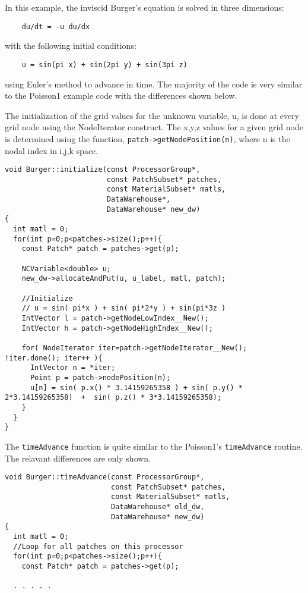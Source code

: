 \documentclass[12pt]{report}
\begin{document}
In this example, the inviscid Burger's equation is solved in three dimensions:
\begin{verbatim}
	du/dt = -u du/dx  
\end{verbatim}

with the following initial conditions:

\begin{verbatim}
	u = sin(pi x) + sin(2pi y) + sin(3pi z)
\end{verbatim}

using Euler's method to advance in time.  The majority of the code is
very similar to the Poisson1 example code with the differences shown
below.

The initialization of the grid values for the unknown variable, u, is
done at every grid node using the NodeIterator construct.  The x,y,z
values for a given grid node is determined using the function,
\texttt{patch->getNodePosition(n)}, where n is the nodal index in
i,j,k space.

\begin{verbatim}
void Burger::initialize(const ProcessorGroup*,
                        const PatchSubset* patches,
                        const MaterialSubset* matls,
                        DataWarehouse*, 
                        DataWarehouse* new_dw)
{
  int matl = 0;
  for(int p=0;p<patches->size();p++){
    const Patch* patch = patches->get(p);

    NCVariable<double> u;
    new_dw->allocateAndPut(u, u_label, matl, patch);

    //Initialize
    // u = sin( pi*x ) + sin( pi*2*y ) + sin(pi*3z )
    IntVector l = patch->getNodeLowIndex__New();
    IntVector h = patch->getNodeHighIndex__New();
    
    for( NodeIterator iter=patch->getNodeIterator__New(); !iter.done(); iter++ ){
      IntVector n = *iter;
      Point p = patch->nodePosition(n);
      u[n] = sin( p.x() * 3.14159265358 ) + sin( p.y() * 2*3.14159265358)  +  sin( p.z() * 3*3.14159265358);
    }
  }
}

\end{verbatim}

The \texttt{timeAdvance} function is quite similar to the Poisson1's
\texttt{timeAdvance} routine.  The relavant differences are only
shown.

\begin{verbatim}
void Burger::timeAdvance(const ProcessorGroup*,
                         const PatchSubset* patches,
                         const MaterialSubset* matls,
                         DataWarehouse* old_dw, 
                         DataWarehouse* new_dw)
{
  int matl = 0;
  //Loop for all patches on this processor
  for(int p=0;p<patches->size();p++){
    const Patch* patch = patches->get(p);
    
  . . . . .
\end{verbatim}
\end{document}
